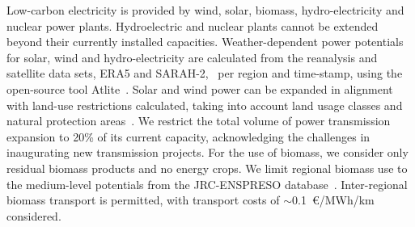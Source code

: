 \documentclass[twocolumn]{article}
\begin{document}

Low-carbon electricity is provided by wind, solar, biomass, hydro-electricity and nuclear power plants. Hydroelectric and nuclear plants cannot be extended beyond their currently installed capacities. Weather-dependent power potentials for solar, wind and hydro-electricity are calculated from the reanalysis and satellite data sets, ERA5 and SARAH-2,~\cite{hersbachERA5GlobalReanalysis2020,pfeifrothSurfaceRadiationData2017} per region and time-stamp, using the open-source tool Atlite~\cite{hofmannAtliteLightweightPython2021}.
Solar and wind power can be expanded in alignment with land-use restrictions calculated, taking into account land usage classes and natural protection areas~\cite{eeaCorineLandCover2012,eeaNatura2000Data2016}. We restrict the total volume of power transmission expansion to 20\% of its current capacity, acknowledging the challenges in inaugurating new transmission projects.
For the use of biomass, we consider only residual biomass products and no energy crops. We limit regional biomass use to the medium-level potentials from the JRC-ENSPRESO database~\cite{enspreso_database,instituteforenergyandtransportjointresearchcentreJRCEUTIMESModelBioenergy2015}. Inter-regional biomass transport is permitted, with transport costs of $\sim$0.1~€/MWh/km considered.

\end{document}
